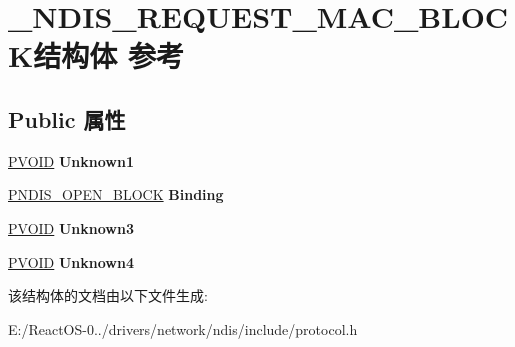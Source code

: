 \hypertarget{struct___n_d_i_s___r_e_q_u_e_s_t___m_a_c___b_l_o_c_k}{}\section{\+\_\+\+N\+D\+I\+S\+\_\+\+R\+E\+Q\+U\+E\+S\+T\+\_\+\+M\+A\+C\+\_\+\+B\+L\+O\+C\+K结构体 参考}
\label{struct___n_d_i_s___r_e_q_u_e_s_t___m_a_c___b_l_o_c_k}
\subsection*{Public 属性}
\begin{DoxyCompactItemize}
\item 
\mbox{\label{struct___n_d_i_s___r_e_q_u_e_s_t___m_a_c___b_l_o_c_k_a80c0bbd4a2bf7f2c1d882664d02415ea}} 
\hyperlink{interfacevoid}{P\+V\+O\+ID} {\bfseries Unknown1}
\item 
\mbox{\label{struct___n_d_i_s___r_e_q_u_e_s_t___m_a_c___b_l_o_c_k_a6880f9b6a6d595ac76a729a955f9944d}} 
\hyperlink{struct___n_d_i_s___o_p_e_n___b_l_o_c_k}{P\+N\+D\+I\+S\+\_\+\+O\+P\+E\+N\+\_\+\+B\+L\+O\+CK} {\bfseries Binding}
\item 
\mbox{\label{struct___n_d_i_s___r_e_q_u_e_s_t___m_a_c___b_l_o_c_k_aa26ad0f3ef5bc6c27773dced050bcb64}} 
\hyperlink{interfacevoid}{P\+V\+O\+ID} {\bfseries Unknown3}
\item 
\mbox{\label{struct___n_d_i_s___r_e_q_u_e_s_t___m_a_c___b_l_o_c_k_a7d2b672170bbadfb4ce3735bf204e70f}} 
\hyperlink{interfacevoid}{P\+V\+O\+ID} {\bfseries Unknown4}
\end{DoxyCompactItemize}


该结构体的文档由以下文件生成\+:\begin{DoxyCompactItemize}
\item 
E\+:/\+React\+O\+S-\/0../drivers/network/ndis/include/protocol.\+h\end{DoxyCompactItemize}

